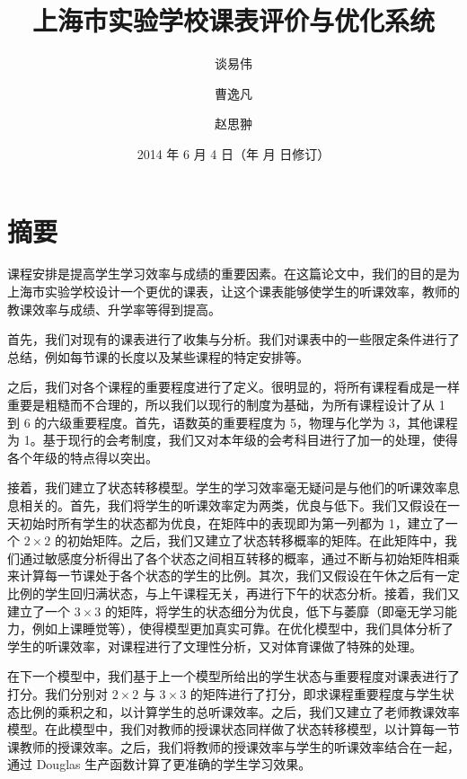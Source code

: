 \documentclass[a4paper]{article}
\begin{document}

\title{\bf 上海市实验学校课表评价与优化系统}
\author{谈易伟 \and 曹逸凡 \and 赵思翀}
\date{2014 年 6 月 4 日（\number\year 年 \number\month 月 \number\day 日修订）}
\maketitle

\thispagestyle{empty}

\section*{\hfil 摘\quad 要}

 课程安排是提高学生学习效率与成绩的重要因素。在这篇论文中，我们的目的是为上海市实验学校设计一个更优的课表，让这个课表能够使学生的听课效率，教师的教课效率与成绩、升学率等得到提高。

 首先，我们对现有的课表进行了收集与分析。我们对课表中的一些限定条件进行了总结，例如每节课的长度以及某些课程的特定安排等。

 之后，我们对各个课程的重要程度进行了定义。很明显的，将所有课程看成是一样重要是粗糙而不合理的，所以我们以现行的制度为基础，为所有课程设计了从 1 到 6 的六级重要程度。首先，语数英的重要程度为 5，物理与化学为 3，其他课程为 1。基于现行的会考制度，我们又对本年级的会考科目进行了加一的处理，使得各个年级的特点得以突出。

 接着，我们建立了状态转移模型。学生的学习效率毫无疑问是与他们的听课效率息息相关的。首先，我们将学生的听课效率定为两类，优良与低下。我们又假设在一天初始时所有学生的状态都为优良，在矩阵中的表现即为第一列都为 1，建立了一个 $2\times2$ 的初始矩阵。之后，我们又建立了状态转移概率的矩阵。在此矩阵中，我们通过敏感度分析得出了各个状态之间相互转移的概率，通过不断与初始矩阵相乘来计算每一节课处于各个状态的学生的比例。其次，我们又假设在午休之后有一定比例的学生回归满状态，与上午课程无关，再进行下午的状态分析。接着，我们又建立了一个 $3\times3$ 的矩阵，将学生的状态细分为优良，低下与萎靡（即毫无学习能力，例如上课睡觉等），使得模型更加真实可靠。在优化模型中，我们具体分析了学生的听课效率，对课程进行了文理性分析，又对体育课做了特殊的处理。

 在下一个模型中，我们基于上一个模型所给出的学生状态与重要程度对课表进行了打分。我们分别对 $2\times2$ 与 $3\times3$ 的矩阵进行了打分，即求课程重要程度与学生状态比例的乘积之和，以计算学生的总听课效率。之后，我们又建立了老师教课效率模型。在此模型中，我们对教师的授课状态同样做了状态转移模型，以计算每一节课教师的授课效率。之后，我们将教师的授课效率与学生的听课效率结合在一起，通过 Douglas 生产函数计算了更准确的学生学习效果。
\end{document}

